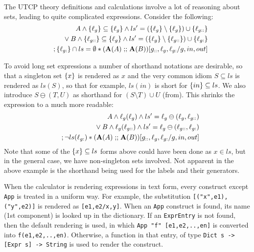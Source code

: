 The UTCP theory definitions and calculations
involve a lot of reasoning about sets,
leading to quite complicated expressions.
Consider the following:
\begin{eqnarray*}
  && A \land \{{\ell_{g}}\} \subseteq \{{\ell_{g}}\}
  \land ls'
    = (\{{\ell_{g}}\} \setminus \{{\ell_{g}}\})
      \cup\{{\ell_{g::}}\}
\\&& {} \lor B \land \{{\ell_{g::}}\} \subseteq \{{\ell_{g}}\}
  \land ls' =
  (\{{\ell_{g}}\} \setminus \{{\ell_{g::}}\})
   \cup \{{\ell_{g:}}\}
\\&& {} ; \{{\ell_{g:}}\} \cap ls = \emptyset * (\mathbf{A}(A) \mathrel{\mathbf{;\!;}} \mathbf{A}(B))[g_{::},\ell_{g},\ell_{g:}/g,in,out]
\end{eqnarray*}

To avoid long set expressions a number of shorthand notations are desirable,
so that a singleton set $\{{x}\}$ is rendered as $x$
and the very common idiom $S \subseteq ls$
is rendered as $ls(S)$,
so that for example, $ls(in)$ is short for $\{{in}\} \subseteq ls$.
We also introduce $S \ominus (T,U)$ as shorthand for $(S \setminus T) \cup U$
(from\cite{DBLP:conf/icfem/WoodcockH02}).
This shrinks the expression to a much more readable:
\begin{eqnarray*}
  && A \land \ell_{g}(\ell_{g}) \land ls' = \ell_{g} \ominus (\ell_{g},\ell_{g::})
\\&& {} \lor B \land \ell_{g}(\ell_{g::}) \land ls' = \ell_{g} \ominus (\ell_{g::},\ell_{g:})
\\&& {} ; \lnot ls(\ell_{g:}) * (\mathbf{A}(A) \mathrel{\mathbf{;\!;}} \mathbf{A}(B))[g_{::},\ell_{g},\ell_{g:}/g,in,out]
\end{eqnarray*}
Note that some of the $\{{x}\} \subseteq ls$ forms above
could have been done as $x \in ls$, but in the general case,
we have non-singleton sets involved.
Not apparent in the above example is the shorthand being used for the labels
and their generators.


When the calculator is rendering expressions in text form,
every construct except \texttt{App} is treated in a uniform way.
For example, the substitution \verb$[("x",e1),("y",e2)]$
is rendered as \verb$[e1,e2/x,y]$.
When an \texttt{App} construct is found, its name (1st component)
is looked up in the dictionary.
If an \texttt{ExprEntry} is not found, then the default rendering is used,
in which \verb$App "f" [e1,e2,..,en]$
is converted into \verb$f(e1,e2,..,en)$.
Otherwise, a function in that entry,
of type \verb$Dict s -> [Expr s] -> String$
is used to render the construct.


